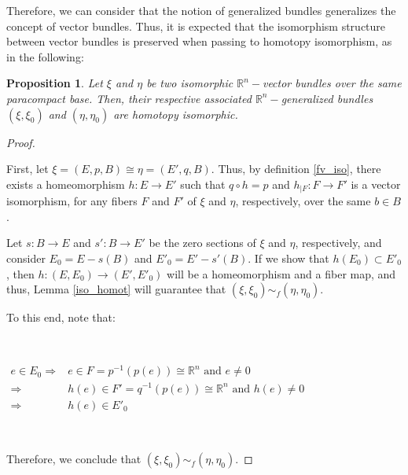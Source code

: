 \documentclass[12pt,oneside]{book}
\newtheorem{prop}   {Proposition}[chapter]
\newcommand{\R}{\mathbb{R}}
\begin{document}
    Therefore, we can consider that the notion of generalized bundles generalizes the concept of vector bundles. Thus, it is expected 
    that the isomorphism structure between vector bundles is preserved when passing to homotopy isomorphism, as 
    in the following:
    
    \begin{prop}\label{iso_fv_fht}
        Let $\xi$ and $\eta$ be two isomorphic $\R^{n}-$vector bundles over the same paracompact base. Then, their 
        respective associated $\R^{n}-$generalized bundles $(\xi,\xi_{0})$ and $(\eta,\eta_{0})$ are homotopy isomorphic.
    \end{prop}
    \begin{proof}
    
        \

        First, let $\xi=(E,p,B)\cong\eta=(E',q,B)$. Thus, by definition \ref{fv_iso}, there exists a homeomorphism $h:E\to E'$ such that 
        $q\circ h=p$ and $h_{|F}:F\to F'$ is a vector isomorphism, for any fibers $F$ and $F'$ of $\xi$ and $\eta$, 
        respectively, over the same $b\in B$.
        
        Let $s:B\to E$ and $s':B\to E'$ be the zero sections of $\xi$ and $\eta$, respectively, and consider 
        $E_{0}=E-s(B)$ and $E'_{0}=E'-s'(B)$. If we show that $h(E_{0})\subset E'_{0}$, then $h:(E,E_{0})\to (E',E'_{0})$ will be a 
        homeomorphism and a fiber map, and thus, Lemma \ref{iso_homot} will guarantee that 
        $(\xi,\xi_{0})\sim_{f} (\eta,\eta_{0})$.
        
        To this end, note that:

        \
        
        $\begin{array}{rl}
            e\in E_{0} \Longrightarrow & e\in F=p^{-1}(p(e))\cong\R^{n} \text{ and } e\neq 0 \\
            \Longrightarrow & h(e)\in F'=q^{-1}(p(e))\cong\R^{n} \text{ and } h(e)\neq 0 \\
            \Longrightarrow & h(e)\in E'_{0}
        \end{array}$

        \
        
        Therefore, we conclude that $(\xi,\xi_{0})\sim_{f} (\eta,\eta_{0})$.
        
    \end{proof}
    
\end{document}
